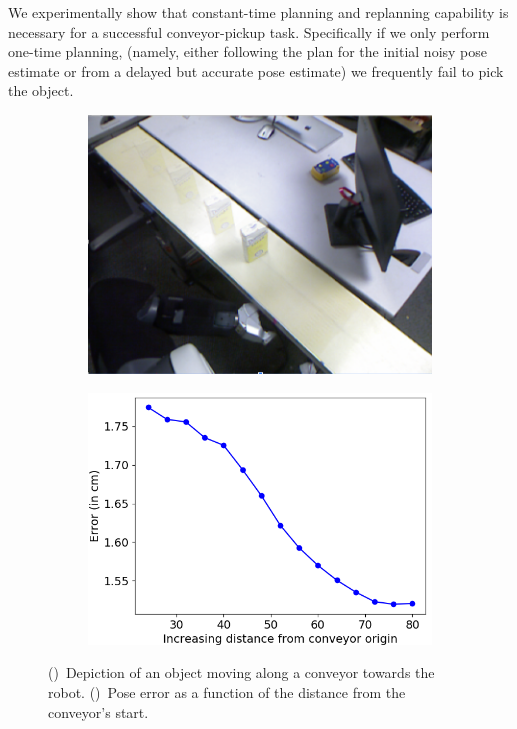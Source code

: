 \documentclass[a4paper]{report}
\begin{document}
%
We experimentally show that constant-time planning and replanning capability is necessary for a successful conveyor-pickup task. Specifically if we only perform one-time planning, (namely, either following the plan for the initial noisy pose estimate or from a delayed but accurate pose estimate) we frequently fail to pick the object.
\begin{figure}[t]
    \centering
    \begin{subfigure}{.49\textwidth}
        \includegraphics[width=1.0\textwidth]{object_blur}
        \caption{}
        \label{fig:obj1}
    \end{subfigure}
    \begin{subfigure}{0.49\textwidth}
        \includegraphics[width=1.0\textwidth]{pose_error_f}
        \caption{}
        \label{fig:obj2}
    \end{subfigure}
    \caption{
    \CaptionTextSize
    ()~Depiction of an object moving along a conveyor towards the robot.
    ()~Pose error as a function of the distance from the conveyor's start.
    }
    \label{fig:pose_sequence}
\end{figure}
\end{document}
